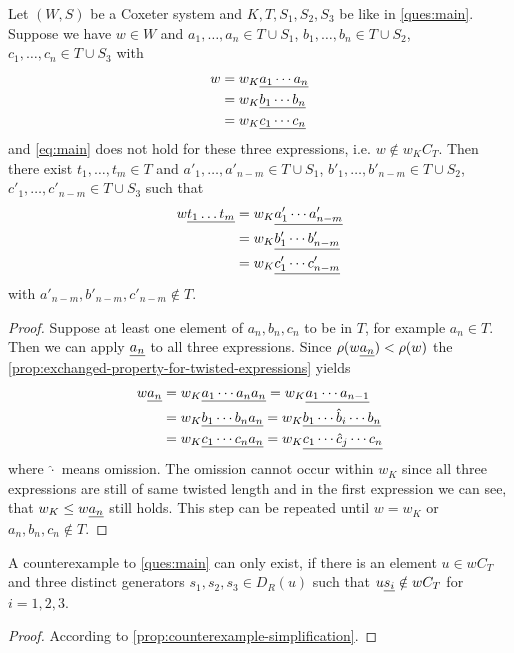 \begin{prop}
	Let $(W,S)$ be a Coxeter system and $K,T,S_1,S_2,S_3$ be like in \ref{ques:main}. Suppose we have $w \in W$ and $a_1,\ldots,a_n \in T \cup S_1$, $b_1,\ldots,b_n \in T \cup S_2$, $c_1,\ldots,c_n \in T \cup S_3$ with
	\begin{align*}
	w & = w_K \underline{ a_1 \cdots a_n } \\
	  & = w_K \underline{ b_1 \cdots b_n } \\
	  & = w_K \underline{ c_1 \cdots c_n }
	\end{align*}
	and \eqref{eq:main} does not hold for these three expressions, i.e. $w \notin w_K C_T$. Then there exist $t_1,\ldots,t_m \in T$ and $a'_1,\ldots,a'_{n-m} \in T \cup S_1$, $b'_1,\ldots,b'_{n-m} \in T \cup S_2$, $c'_1,\ldots,c'_{n-m} \in T \cup S_3$ such that
	\begin{align*}
		w \underline{t_1 \ldots t_m} & = w_K \underline{ a'_1 \cdots a'_{n-m} } \\
							   & = w_K \underline{ b'_1 \cdots b'_{n-m} } \\
							   & = w_K \underline{ c'_1 \cdots c'_{n-m} }
	\end{align*}
	with $a'_{n-m},b'_{n-m},c'_{n-m} \notin T$.

	\begin{proof}
		Suppose at least one element of $a_n,b_n,c_n$ to be in $T$, for example $a_n \in T$. Then we can apply $\underline{a_n}$ to all three expressions. Since $\rho (w \underline{a_n}) < \rho(w)$ the \ref{prop:exchanged-property-for-twisted-expressions} yields
		\begin{align*}
			w \underline{a_n} & = w_K \underline{ a_1 \cdots a_n a_n } = w_K \underline{ a_1 \cdots a_{n-1} } \\
					   & = w_K \underline{ b_1 \cdots b_n a_n } = w_K \underline{ b_1 \cdots \hat b_i \cdots b_n } \\
					   & = w_K \underline{ c_1 \cdots c_n a_n } = w_K \underline{ c_1 \cdots \hat c_j \cdots c_n }
		\end{align*}
		where $\hat \cdot$ means omission. The omission cannot occur within $w_K$ since all three expressions are still of same twisted length and in the first expression we can see, that $w_K \leq w \underline{a_n}$ still holds. This step can be repeated until $w = w_K$ or $a_n,b_n,c_n \notin T$.
	\end{proof}
\end{prop}

\begin{lemm}
	A counterexample to \ref{ques:main} can only exist, if there
	is an element $u \in w C_T$ and three distinct generators $s_1,s_2,s_3 \in
	D_R(u)$ such that $u \underline{s_i} \notin w C_T$ for $i=1,2,3$.

	\begin{proof}
		According to \ref{prop:counterexample-simplification}.
	\end{proof}
\end{lemm}

